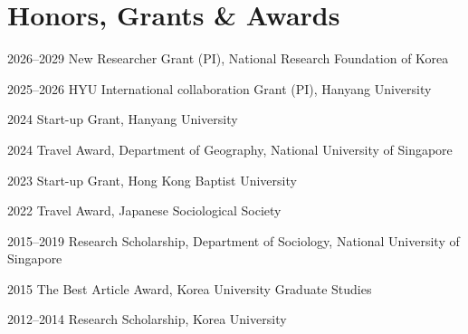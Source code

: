 \section{Honors, Grants \& Awards}
\begin{aka}
    \item [2026--2029] New Researcher Grant (PI), National Research Foundation of Korea

    \item [2025--2026] HYU International collaboration Grant (PI), Hanyang University

    \item [2024] Start-up Grant, Hanyang University

    \item [2024] Travel Award, Department of Geography, National University of Singapore

    \item [2023] Start-up Grant, Hong Kong Baptist University

    \item [2022] Travel Award, Japanese Sociological Society

    \item [2015--2019] Research Scholarship, Department of Sociology, National University of Singapore

    \item [2015] The Best Article Award, Korea University Graduate Studies

    \item [2012--2014] Research Scholarship, Korea University

\end{aka}
